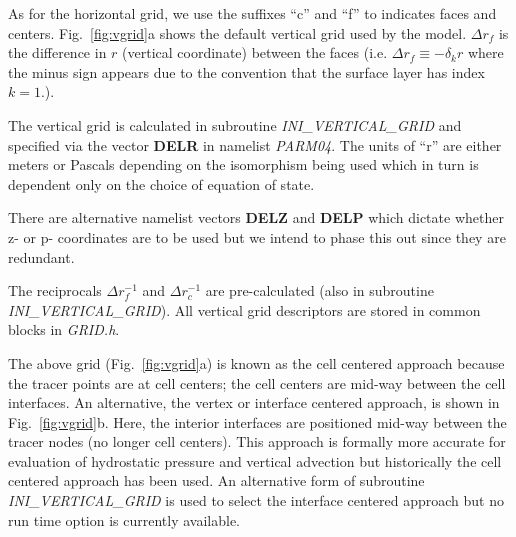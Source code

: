 As for the horizontal grid, we use the suffixes ``c'' and ``f'' to
indicates faces and centers. Fig.~\ref{fig:vgrid}a shows the default
vertical grid used by the model.
$\Delta r_f$ is the difference in $r$
(vertical coordinate) between the faces (i.e. $\Delta r_f \equiv -
\delta_k r$ where the minus sign appears due to the convention that the
surface layer has index $k=1$.).

The vertical grid is calculated in subroutine {\em
INI\_VERTICAL\_GRID} and specified via the vector {\bf DELR} in
namelist {\em PARM04}. The units of ``r'' are either meters or Pascals
depending on the isomorphism being used which in turn is dependent
only on the choice of equation of state.

There are alternative namelist vectors {\bf DELZ} and {\bf DELP} which
dictate whether z- or
p- coordinates are to be used but we intend to
phase this out since they are redundant.

The reciprocals $\Delta r_f^{-1}$ and $\Delta r_c^{-1}$ are
pre-calculated (also in subroutine {\em INI\_VERTICAL\_GRID}). All
vertical grid descriptors are stored in common blocks in {\em GRID.h}.

The above grid (Fig.~\ref{fig:vgrid}a) is known as the cell centered
approach because the tracer points are at cell centers; the cell
centers are mid-way between the cell interfaces. An alternative, the
vertex or interface centered approach, is shown in
Fig.~\ref{fig:vgrid}b. Here, the interior interfaces are positioned
mid-way between the tracer nodes (no longer cell centers). This
approach is formally more accurate for evaluation of hydrostatic
pressure and vertical advection but historically the cell centered
approach has been used. An alternative form of subroutine {\em
INI\_VERTICAL\_GRID} is used to select the interface centered approach
but no run time option is currently available.



